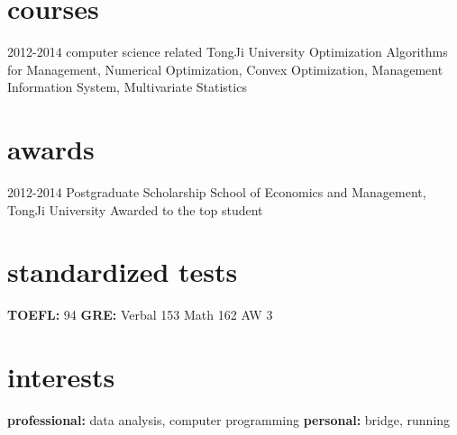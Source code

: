 \documentclass[]{friggeri-cv} %
\begin{document}
\section{courses}
\begin{entrylist}
\entry
{2012-2014}
{computer science related}
{TongJi University}
{Optimization Algorithms for Management,
Numerical Optimization,
Convex Optimization, 
Management Information System,
Multivariate Statistics}
\end{entrylist}




\section{awards}
\begin{entrylist}
\entry
{2012-2014}
{Postgraduate Scholarship}
{School of Economics and Management, TongJi University}
{Awarded to the top student}
\end{entrylist}


\section{standardized tests}
{\textbf{TOEFL:} 94  \textbf{GRE:} Verbal 153 Math 162 AW 3}



\section{interests}
{\textbf{professional:} data analysis, computer programming  \textbf{personal:} bridge, running}

\end{document}
